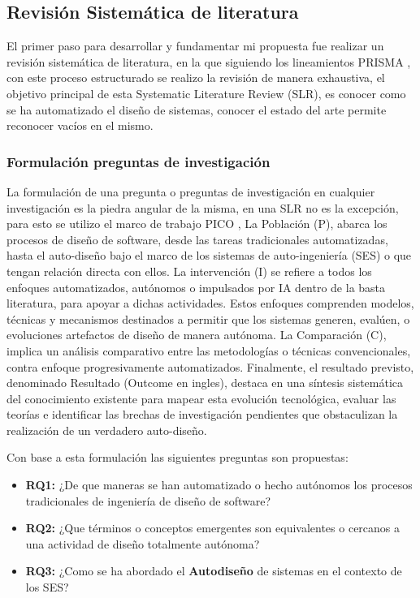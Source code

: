 \documentclass[12pt, letterpaper, oneside]{book}
\begin{document}
\subsection{Revisión Sistemática de literatura}

El primer paso para desarrollar y fundamentar mi propuesta fue realizar un revisión sistemática de literatura, en la que siguiendo los lineamientos PRISMA \cite{Pagen2020PRISMA}, con este proceso estructurado se realizo la revisión de manera exhaustiva, el objetivo principal de esta Systematic Literature Review (SLR), es conocer como se ha automatizado el diseño de sistemas, conocer el estado del arte permite reconocer vacíos en el mismo.
\subsubsection{Formulación preguntas de investigación}

La formulación de una pregunta o preguntas de investigación en cualquier investigación es la piedra angular de la misma, en una SLR no es la excepción, para esto se utilizo el marco de trabajo PICO \cite{barbaraGuidelines}, La Población (P), abarca los procesos de diseño de software, desde las tareas tradicionales automatizadas, hasta el auto-diseño bajo el marco de los sistemas de auto-ingeniería (SES) o que tengan relación directa con ellos. La intervención (I) se refiere a todos los enfoques automatizados, autónomos o impulsados por IA dentro de la basta literatura, para apoyar a dichas actividades. Estos enfoques comprenden modelos, técnicas y mecanismos destinados a permitir que los sistemas generen, evalúen, o evoluciones artefactos de diseño de manera autónoma. La Comparación (C), implica un análisis comparativo entre las metodologías o técnicas convencionales, contra enfoque progresivamente automatizados. Finalmente, el resultado previsto, denominado Resultado (Outcome en ingles), destaca en una síntesis sistemática del conocimiento existente para mapear esta evolución tecnológica, evaluar las teorías e identificar las brechas de investigación pendientes que obstaculizan la realización de un verdadero auto-diseño.

Con base a esta formulación las siguientes preguntas son propuestas:

\begin{itemize}
	\item \textbf{RQ1:} ¿De que maneras se han automatizado o hecho autónomos los procesos tradicionales de ingeniería de diseño de software?
	\item \textbf{RQ2:} ¿Que términos o conceptos emergentes son equivalentes o cercanos a una actividad de diseño totalmente autónoma?
	\item \textbf{RQ3:} ¿Como se ha abordado el  \textbf{Autodiseño} de sistemas en el contexto de los SES?
\end{itemize}
\end{document}

